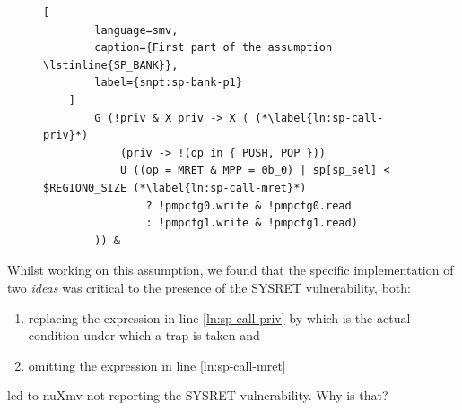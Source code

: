 \begin{figure}
    \begin{lstlisting}[
        language=smv,
        caption={First part of the assumption \lstinline{SP_BANK}},
        label={snpt:sp-bank-p1}
    ]
        G (!priv & X priv -> X ( (*\label{ln:sp-call-priv}*)
            (priv -> !(op in { PUSH, POP }))
            U ((op = MRET & MPP = 0b_0) | sp[sp_sel] < $REGION0_SIZE (*\label{ln:sp-call-mret}*)
                ? !pmpcfg0.write & !pmpcfg0.read
                : !pmpcfg1.write & !pmpcfg1.read)
        )) &
    \end{lstlisting}
\end{figure}

Whilst working on this assumption, we found that the specific implementation of two \textit{ideas} was critical to the presence of the SYSRET vulnerability, both:
\begin{enumerate}
    \item \label{itm:no-sysret-priv}
    replacing the expression  in line \ref{ln:sp-call-priv} by  which is the actual condition under which a trap is taken and
    \item \label{itm:no-sysret-mret}
    omitting the expression  in line \ref{ln:sp-call-mret}
\end{enumerate}
led to nuXmv not reporting the SYSRET vulnerability.
Why is that?

